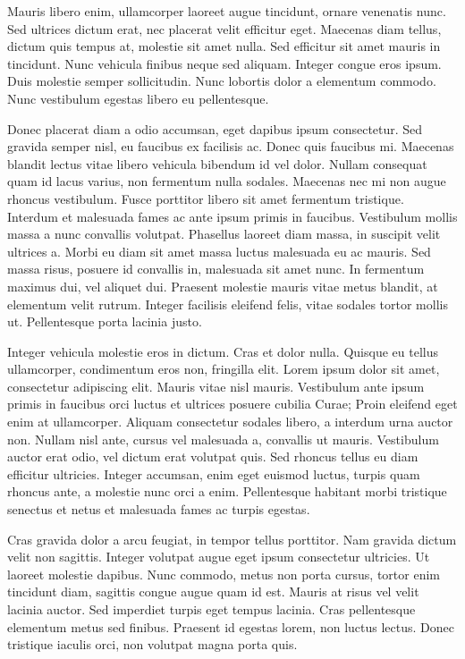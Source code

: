\documentclass{article}
\begin{document}
	Mauris libero enim, ullamcorper laoreet augue tincidunt, ornare venenatis nunc. Sed ultrices dictum erat, nec placerat velit efficitur eget. Maecenas diam tellus, dictum quis tempus at, molestie sit amet nulla. Sed efficitur sit amet mauris in tincidunt. Nunc vehicula finibus neque sed aliquam. Integer congue eros ipsum. Duis molestie semper sollicitudin. Nunc lobortis dolor a elementum commodo. Nunc vestibulum egestas libero eu pellentesque.
	
	Donec placerat diam a odio accumsan, eget dapibus ipsum consectetur. Sed gravida semper nisl, eu faucibus ex facilisis ac. Donec quis faucibus mi. Maecenas blandit lectus vitae libero vehicula bibendum id vel dolor. Nullam consequat quam id lacus varius, non fermentum nulla sodales. Maecenas nec mi non augue rhoncus vestibulum. Fusce porttitor libero sit amet fermentum tristique. Interdum et malesuada fames ac ante ipsum primis in faucibus. Vestibulum mollis massa a nunc convallis volutpat. Phasellus laoreet diam massa, in suscipit velit ultrices a. Morbi eu diam sit amet massa luctus malesuada eu ac mauris. Sed massa risus, posuere id convallis in, malesuada sit amet nunc. In fermentum maximus dui, vel aliquet dui. Praesent molestie mauris vitae metus blandit, at elementum velit rutrum. Integer facilisis eleifend felis, vitae sodales tortor mollis ut. Pellentesque porta lacinia justo.
	
	Integer vehicula molestie eros in dictum. Cras et dolor nulla. Quisque eu tellus ullamcorper, condimentum eros non, fringilla elit. Lorem ipsum dolor sit amet, consectetur adipiscing elit. Mauris vitae nisl mauris. Vestibulum ante ipsum primis in faucibus orci luctus et ultrices posuere cubilia Curae; Proin eleifend eget enim at ullamcorper. Aliquam consectetur sodales libero, a interdum urna auctor non. Nullam nisl ante, cursus vel malesuada a, convallis ut mauris. Vestibulum auctor erat odio, vel dictum erat volutpat quis. Sed rhoncus tellus eu diam efficitur ultricies. Integer accumsan, enim eget euismod luctus, turpis quam rhoncus ante, a molestie nunc orci a enim. Pellentesque habitant morbi tristique senectus et netus et malesuada fames ac turpis egestas.
	
	Cras gravida dolor a arcu feugiat, in tempor tellus porttitor. Nam gravida dictum velit non sagittis. Integer volutpat augue eget ipsum consectetur ultricies. Ut laoreet molestie dapibus. Nunc commodo, metus non porta cursus, tortor enim tincidunt diam, sagittis congue augue quam id est. Mauris at risus vel velit lacinia auctor. Sed imperdiet turpis eget tempus lacinia. Cras pellentesque elementum metus sed finibus. Praesent id egestas lorem, non luctus lectus. Donec tristique iaculis orci, non volutpat magna porta quis.
\end{document}
